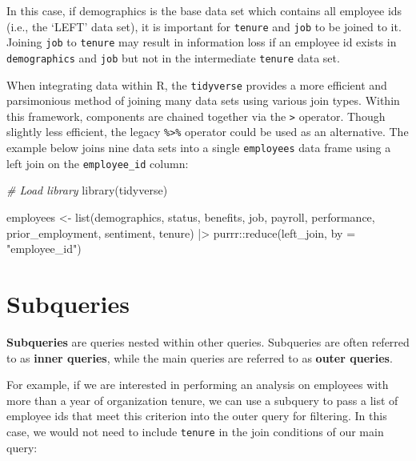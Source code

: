 \documentclass[
]{book}
\newenvironment{Shaded}{\begin{snugshade}}{\end{snugshade}}
\newcommand{\AttributeTok}[1]{\textcolor[rgb]{0.77,0.63,0.00}{#1}}
\newcommand{\CommentTok}[1]{\textcolor[rgb]{0.56,0.35,0.01}{\textit{#1}}}
\newcommand{\FunctionTok}[1]{\textcolor[rgb]{0.00,0.00,0.00}{#1}}
\newcommand{\NormalTok}[1]{#1}
\newcommand{\OtherTok}[1]{\textcolor[rgb]{0.56,0.35,0.01}{#1}}
\newcommand{\SpecialCharTok}[1]{\textcolor[rgb]{0.00,0.00,0.00}{#1}}
\newcommand{\StringTok}[1]{\textcolor[rgb]{0.31,0.60,0.02}{#1}}
\begin{document}
In this case, if demographics is the base data set which contains all employee ids (i.e., the `LEFT' data set), it is important for \texttt{tenure} and \texttt{job} to be joined to it. Joining \texttt{job} to \texttt{tenure} may result in information loss if an employee id exists in \texttt{demographics} and \texttt{job} but not in the intermediate \texttt{tenure} data set.

When integrating data within R, the \texttt{tidyverse} provides a more efficient and parsimonious method of joining many data sets using various join types. Within this framework, components are chained together via the \texttt{\textbar{}\textgreater{}} operator. Though slightly less efficient, the legacy \texttt{\%\textgreater{}\%} operator could be used as an alternative. The example below joins nine data sets into a single \texttt{employees} data frame using a left join on the \texttt{employee\_id} column:

\begin{Shaded}
\begin{Highlighting}[]
\CommentTok{\# Load library}
\FunctionTok{library}\NormalTok{(tidyverse)}

\NormalTok{employees }\OtherTok{\textless{}{-}} \FunctionTok{list}\NormalTok{(demographics,}
\NormalTok{                  status,}
\NormalTok{                  benefits,}
\NormalTok{                  job,}
\NormalTok{                  payroll,}
\NormalTok{                  performance,}
\NormalTok{                  prior\_employment,}
\NormalTok{                  sentiment,}
\NormalTok{                  tenure) }\SpecialCharTok{|\textgreater{}}
\NormalTok{                  purrr}\SpecialCharTok{::}\FunctionTok{reduce}\NormalTok{(left\_join, }\AttributeTok{by =} \StringTok{"employee\_id"}\NormalTok{)}
\end{Highlighting}
\end{Shaded}

\hypertarget{subqueries}{%
\section{Subqueries}\label{subqueries}}

\textbf{Subqueries} are queries nested within other queries. Subqueries are often referred to as \textbf{inner queries}, while the main queries are referred to as \textbf{outer queries}.

For example, if we are interested in performing an analysis on employees with more than a year of organization tenure, we can use a subquery to pass a list of employee ids that meet this criterion into the outer query for filtering. In this case, we would not need to include \texttt{tenure} in the join conditions of our main query:
\end{document}
